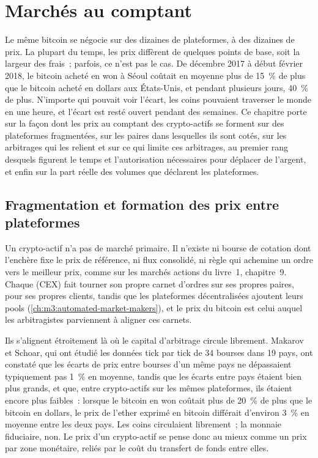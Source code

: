 \chapter{Marchés au comptant}\label{ch:m3:spot-markets}

Le même bitcoin se négocie sur des dizaines de plateformes, à des dizaines de prix. La plupart du temps, les prix diffèrent
de quelques points de base, soit la largeur des frais~; parfois, ce n'est pas le cas. De décembre 2017 à début février
2018, le bitcoin acheté en won à Séoul coûtait en moyenne plus de 15~\% de plus que le bitcoin
acheté en dollars aux États-Unis, et pendant plusieurs jours, 40~\% de plus. N'importe qui pouvait voir l'écart, les coins
pouvaient traverser le monde en une heure, et l'écart est resté ouvert pendant des semaines. Ce chapitre porte sur la façon dont
les prix au comptant des crypto-actifs se forment sur des plateformes fragmentées, sur les paires dans lesquelles ils sont cotés, sur les arbitrages qui
les relient et sur ce qui limite ces arbitrages, au premier rang desquels figurent le temps et l'autorisation nécessaires pour déplacer de l'argent, et enfin
sur la part réelle des volumes que déclarent les plateformes.

\section{Fragmentation et formation des prix entre plateformes}

Un crypto-actif n'a pas de marché primaire. Il n'existe ni bourse de cotation dont l'enchère fixe le prix de référence, ni flux consolidé, ni règle
qui achemine un ordre vers le meilleur prix, comme sur les marchés actions du livre~1, chapitre~9. Chaque  (CEX) fait tourner
son propre carnet d'ordres sur ses propres paires, pour ses propres clients, tandis que les plateformes décentralisées ajoutent leurs pools
(\cref{ch:m3:automated-market-makers}), et le prix du bitcoin est celui auquel
les arbitragistes parviennent à aligner ces carnets.

Ils s'alignent étroitement là où le capital d'arbitrage circule librement. Makarov et Schoar, qui ont étudié les données tick par tick de 34 bourses dans 19
pays, ont constaté que les écarts de prix entre bourses d'un même pays ne dépassaient typiquement
pas 1~\% en moyenne, tandis que les écarts entre pays étaient bien plus grands, et que, entre crypto-actifs sur les mêmes plateformes,
ils étaient encore plus faibles~: lorsque le bitcoin en won coûtait plus de 20~\% de plus
que le bitcoin en dollars, le prix de l'ether exprimé en bitcoin différait d'environ 3~\% en moyenne entre les deux
pays. Les coins circulaient librement~; la monnaie fiduciaire, non. Le prix d'un crypto-actif se pense donc au mieux
comme un prix par zone monétaire, reliés par le coût du transfert de fonds entre elles.

